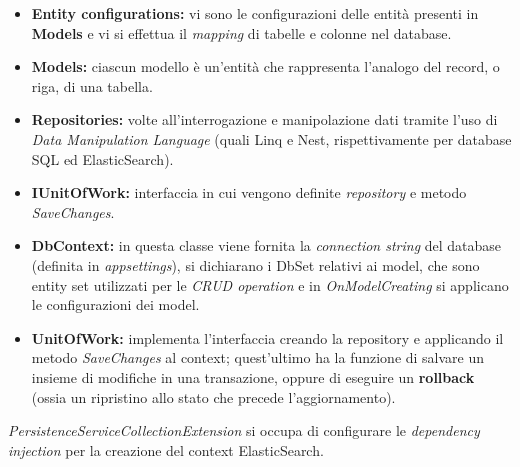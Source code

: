 \begin{itemize}
\item 
\textbf{Entity configurations:} vi sono le configurazioni delle entità presenti in \textbf{Models} e vi si effettua il \textit{mapping} di tabelle e colonne nel database.
\item
\textbf{Models:} ciascun modello è un'entità che rappresenta l'analogo del record, o riga, di una tabella.
\item 
\textbf{Repositories:} volte all'interrogazione e manipolazione dati tramite l'uso di \textit{Data Manipulation Language} (quali Linq e Nest, rispettivamente per database SQL ed ElasticSearch).
\item 
\textbf{IUnitOfWork:} interfaccia in cui vengono definite \textit{repository} e metodo \textit{SaveChanges}.
\item
\textbf{DbContext:} in questa classe viene fornita la \textit{connection string} del database (definita in \textit{appsettings}), si dichiarano i DbSet relativi ai model, che sono entity set utilizzati per le \textit{CRUD operation} \cite{DbSet} e in \textit{OnModelCreating} si applicano le configurazioni dei model.
\item 
\textbf{UnitOfWork:} implementa l'interfaccia creando la repository e applicando il metodo \textit{SaveChanges} al context; quest'ultimo ha la funzione di salvare un insieme di modifiche in una transazione, oppure di eseguire un \textbf{rollback} (ossia un ripristino allo stato che precede l'aggiornamento).
\end{itemize}
\textit{PersistenceServiceCollectionExtension} si occupa di configurare le \textit{dependency injection} per la creazione del context ElasticSearch.